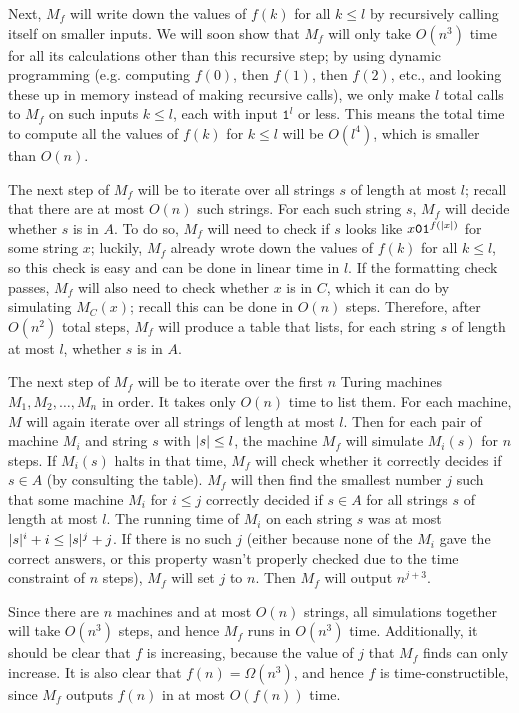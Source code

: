 \documentclass[11pt,twoside=off,numbers=noenddot]{scrbook}
\begin{document}
Next, $M_f$ will write down the values of $f(k)$ for all $k \leq l$ by recursively calling itself on smaller inputs. We will soon show that $M_f$ will only take $O(n^3)$ time for all its calculations other than this recursive step; by using dynamic programming (e.g. computing $f(0)$, then $f(1)$, then $f(2)$, etc., and looking these up in memory instead of making recursive calls), we only make $l$ total calls to $M_f$ on such inputs $k \leq l$, each with input $\texttt{1}^l$ or less. This means the total time to compute all the values of $f(k)$ for $k \leq l$ will be $O(l^4)$, which is smaller than $O(n)$.

The next step of $M_f$ will be to iterate over all strings $s$ of length at most $l$; recall that there are at most $O(n)$ such strings. For each such string $s$, $M_f$ will decide whether $s$ is in $A$. To do so, $M_f$ will need to check if $s$ looks like $x\texttt{0}\texttt{1}^{f(| x |)}$ for some string $x$; luckily, $M_f$ already wrote down the values of $f(k)$ for all $k \leq l$, so this check is easy and can be done in linear time in $l$. If the formatting check passes, $M_f$ will also need to check whether $x$ is in $C$, which it can do by simulating $M_C(x)$; recall this can be done in $O(n)$ steps. Therefore, after $O(n^2)$ total steps, $M_f$ will produce a table that lists, for each string $s$ of length at most $l$, whether $s$ is in $A$.

The next step of $M_f$ will be to iterate over the first $n$ Turing machines $M_1, M_2, \dots, M_n$ in order. It takes only $O(n)$ time to list them. For each machine, $M$ will again iterate over all strings of length at most $l$. Then for each pair of machine $M_i$ and string $s$ with $| s | \leq l$, the machine $M_f$ will simulate $M_i(s)$ for $n$ steps. If $M_i(s)$ halts in that time, $M_f$ will check whether it correctly decides if $s \in A$ (by consulting the table). $M_f$ will then find the smallest number $j$ such that some machine $M_i$ for $i \leq j$ correctly decided if $s \in A$ for all strings $s$ of length at most $l$. The running time of $M_i$ on each string $s$ was at most $| s |^i + i \leq | s |^j + j$. If there is no such $j$ (either because none of the $M_i$ gave the correct answers, or this property wasn't properly checked due to the time constraint of $n$ steps), $M_f$ will set $j$ to $n$. Then $M_f$ will output $n^{j + 3}$.

Since there are $n$ machines and at most $O(n)$ strings, all simulations together will take $O(n^3)$ steps, and hence $M_f$ runs in $O(n^3)$ time. Additionally, it should be clear that $f$ is increasing, because the value of $j$ that $M_f$ finds can only increase. It is also clear that $f(n) = \Omega(n^3)$, and hence $f$ is time-constructible, since $M_f$ outputs $f(n)$ in at most $O(f(n))$ time.
\end{document}
